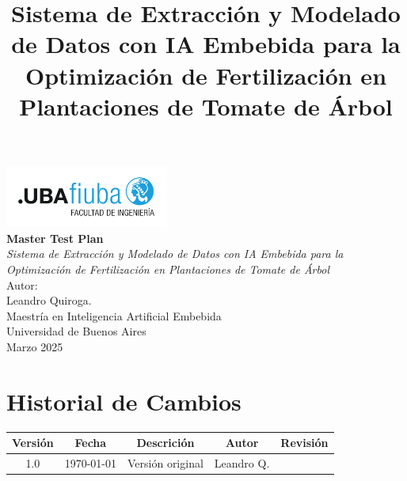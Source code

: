 \documentclass[12pt,a4paper, twosite]{article}
\date{}
\title{Sistema de Extracción y Modelado de Datos con IA Embebida para la Optimización de Fertilización en Plantaciones de Tomate de Árbol}
\begin{document}
\begin{titlepage}
\begin{center}

\includegraphics[width=0.4\textwidth]{img/logo.png}\\[1cm]

{\huge\bfseries Master Test Plan}\\[2cm]

{\Large\textit{Sistema de Extracción y Modelado de Datos con IA Embebida para la Optimización de Fertilización en Plantaciones de Tomate de Árbol}}\\[2cm]

{\large Autor:\\
Leandro Quiroga.}\\[1cm]

{\large Maestría en Inteligencia Artificial Embebida\\
Universidad de Buenos Aires}\\[1cm]
{\large Marzo 2025}\\[1cm]
\vfill

\end{center}
\end{titlepage}

\section*{Historial de Cambios}
\begin{center}
\begin{tabular}{|c|c|c|c|c|}
\hline
\textbf{Versión} & \textbf{Fecha}  & \textbf{Descrición} & \textbf{Autor} & \textbf{Revisión} \\\hline
\hline
1.0 & \today & Versión original & Leandro Q. &  \\\hline\end{tabular}
\end{center}

\clearpage

\tableofcontents

\newpage
\end{document}
